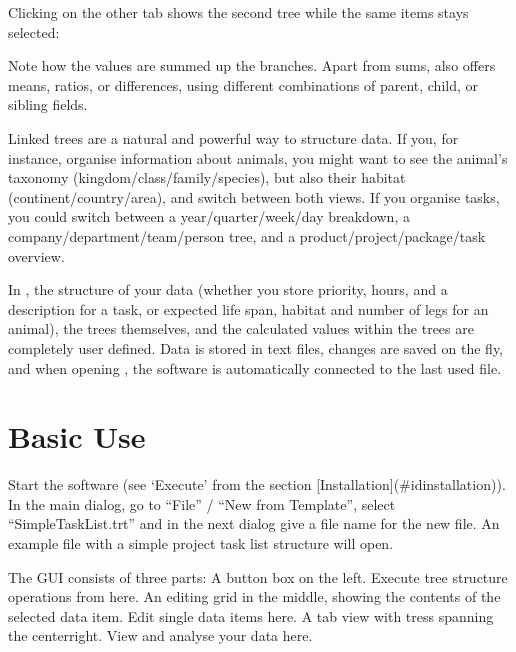 \documentclass[letterpaper,10pt,english]{sphinxmanual}
\begin{document}
\sphinxAtStartPar
Clicking on the other tab shows the second tree while the same items stays selected:


\sphinxAtStartPar
Note how the values are summed up the branches.
Apart from sums,  also offers means, ratios, or differences, using different combinations of parent, child, or sibling fields.

\sphinxAtStartPar
Linked trees are a natural and powerful way to structure data.
If you, for instance, organise information about animals, you might want to see the animal’s taxonomy (kingdom/class/family/species), but also their habitat (continent/country/area), and switch between both views.
If you organise tasks, you could switch between a year/quarter/week/day breakdown, a company/department/team/person tree, and a product/project/package/task overview.

\sphinxAtStartPar
In , the structure of your data (whether you store priority, hours, and a description for a task, or expected life span, habitat and number of legs for an animal), the trees themselves, and the calculated values within the trees are completely user defined. Data is stored in text files, changes are saved on the fly, and when opening , the software is automatically connected to the last used file.


\section{Basic Use}
\label{\detokenize{introduction:basic-use}}
\sphinxAtStartPar
Start the software (see ‘Execute’ from the section {[}Installation{]}(\#id\sphinxhyphen{}installation)). In the main dialog, go to “File” / “New from Template”, select “Simple\sphinxhyphen{}Task\sphinxhyphen{}List.trt” and in the next dialog give a file name for the new file. An example file with a simple project task list structure will open.

\sphinxAtStartPar
The GUI consists of three parts:
\sphinxhyphen{} A button box on the left. Execute tree structure operations from here.
\sphinxhyphen{} An editing grid in the middle, showing the contents of the selected data item. Edit single data items here.
\sphinxhyphen{} A tab view with tress spanning the center\sphinxhyphen{}right. View and analyse your data here.
\end{document}
